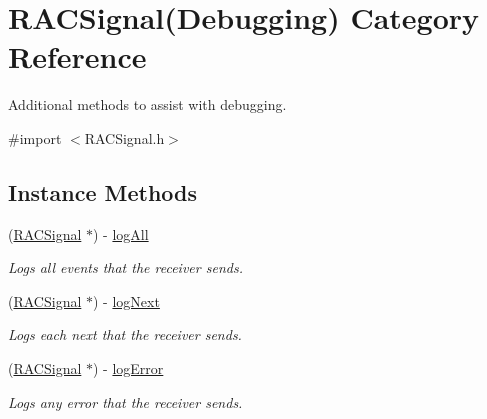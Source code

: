 \hypertarget{category_r_a_c_signal_07_debugging_08}{}\section{R\+A\+C\+Signal(Debugging) Category Reference}
\label{category_r_a_c_signal_07_debugging_08}


Additional methods to assist with debugging.  




{\ttfamily \#import $<$R\+A\+C\+Signal.\+h$>$}

\subsection*{Instance Methods}
\begin{DoxyCompactItemize}
\item 
\mbox{\label{category_r_a_c_signal_07_debugging_08_a8b05d15ed41ef0ad3cea3ada8eaf44b8}} 
(\mbox{\hyperlink{interface_r_a_c_signal}{R\+A\+C\+Signal}} $\ast$) -\/ \mbox{\hyperlink{category_r_a_c_signal_07_debugging_08_a8b05d15ed41ef0ad3cea3ada8eaf44b8}{log\+All}}
\begin{DoxyCompactList}\small\item\em Logs all events that the receiver sends. \end{DoxyCompactList}\item 
\mbox{\label{category_r_a_c_signal_07_debugging_08_a86ec9c26b61ad04d28734fff78d109e3}} 
(\mbox{\hyperlink{interface_r_a_c_signal}{R\+A\+C\+Signal}} $\ast$) -\/ \mbox{\hyperlink{category_r_a_c_signal_07_debugging_08_a86ec9c26b61ad04d28734fff78d109e3}{log\+Next}}
\begin{DoxyCompactList}\small\item\em Logs each {\ttfamily next} that the receiver sends. \end{DoxyCompactList}\item 
\mbox{\label{category_r_a_c_signal_07_debugging_08_a1b2a24547c2229684cab95040feafe97}} 
(\mbox{\hyperlink{interface_r_a_c_signal}{R\+A\+C\+Signal}} $\ast$) -\/ \mbox{\hyperlink{category_r_a_c_signal_07_debugging_08_a1b2a24547c2229684cab95040feafe97}{log\+Error}}
\begin{DoxyCompactList}\small\item\em Logs any error that the receiver sends. \end{DoxyCompactList}\item 

\end{DoxyCompactItemize}
